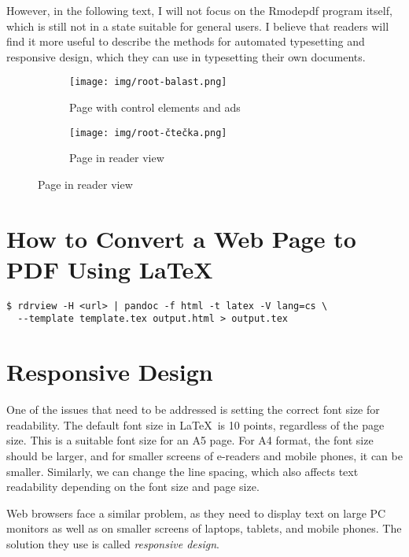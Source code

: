 \documentclass{ltugboat}
\newcommand\program[1]{#1}
\begin{document}
However, in the following text, I will not focus on the \program{Rmodepdf}
program itself, which is still not in a state suitable for general users. I
believe that readers will find it more useful to describe the methods for
automated typesetting and responsive design, which they can use in typesetting
their own documents.

\begin{figure}[tbp]
  \centering
  \caption{Example of using the \emph{reader view} mode in the \program{Firefox} browser}
  \label{fig:readermode}
  \begin{subfigure}[t]{0.45\textwidth}
    \texttt{[image: img/root-balast.png]}
    \caption{Page with control elements and ads}
  \end{subfigure}
  \hfill
  \begin{subfigure}[t]{0.45\textwidth}
    \texttt{[image: img/root-čtečka.png]}
    \caption{Page in reader view}
  \end{subfigure}
\end{figure}

\section{How to Convert a Web Page to PDF Using \LaTeX}


\begin{verbatim}
$ rdrview -H <url> | pandoc -f html -t latex -V lang=cs \
  --template template.tex output.html > output.tex
\end{verbatim}


\section{Responsive Design}

One of the issues that need to be addressed is setting the correct font size
for readability. The default font size in \LaTeX\ is 10 points, regardless of
the page size. This is a suitable font size for an A5 page. For A4 format, the
font size should be larger, and for smaller screens of e-readers and mobile
phones, it can be smaller. Similarly, we can change the line spacing, which
also affects text readability depending on the font size and page size.

Web browsers face a similar problem, as they need to display text on large PC
monitors as well as on smaller screens of laptops, tablets, and mobile phones.
The solution they use is called \textit{responsive design}.
\end{document}
